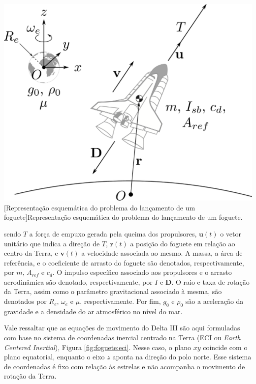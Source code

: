 \noindent	
\begin{minipage}{\textwidth}
	\vspace{\onelineskip}
	\centering
	\includegraphics[width=0.75\linewidth]{draw/resultados/pdf/foguete}
	[Representação esquemática do problema do lançamento de um foguete]{Representação esquemática do problema do lançamento de um foguete.}
	\label{fig:foguete:foguete}
	\vspace{\onelineskip}
\end{minipage}
%
sendo $ T $ a força de empuxo gerada pela queima dos propulsores, $ \mathbf{u}(t) $ o vetor unitário que indica a direção de $ T $, $ \mathbf{r}(t) $ a posição do foguete em relação ao centro da Terra, e $ \mathbf{v}(t) $ a velocidade associada ao mesmo. A massa, a área de referência, e o coeficiente de arrasto do foguete são denotados, respectivamente, por $ m $, $ A_{ref} $ e $ c_d $. O impulso específico associado aos propulsores e o arrasto aerodinâmica são denotado, respectivamente, por $ I $ e $ \mathbf{D} $. O raio e taxa de rotação da Terra, assim como o parâmetro gravitacional associado à mesma, são denotados por $ R_e $, $ \omega_e $ e $ \mu $, respectivamente. Por fim, $ g_0 $ e $ \rho_0 $ são a aceleração da gravidade e a densidade do ar atmosférico no nível do mar. 

Vale ressaltar que as equações de movimento do Delta III são aqui formuladas com base no sistema de coordenadas inercial centrado na Terra (ECI ou \textit{Earth Centered Inertial}), Figura \ref{fig:foguete:eci}. Nesse caso, o plano $ xy $ coincide com o plano equatorial, enquanto o eixo $ z $ aponta na direção do polo norte. Esse sistema de coordenadas é fixo com relação às estrelas e não acompanha o movimento de rotação da Terra.  

